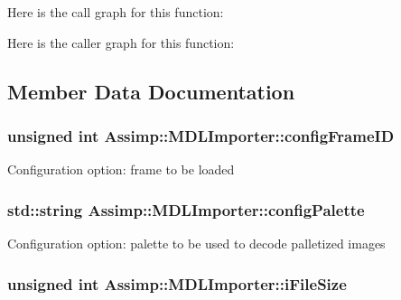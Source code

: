 Here is the call graph for this function\+:




Here is the caller graph for this function\+:




\subsection{Member Data Documentation}
\hypertarget{class_assimp_1_1_m_d_l_importer_a4c132778226da8c47fa3bc964c2cca73}{
\subsubsection[{config\+Frame\+I\+D}]{\setlength{\rightskip}{0pt plus 5cm}unsigned int Assimp\+::\+M\+D\+L\+Importer\+::config\+Frame\+I\+D\hspace{0.3cm}{\ttfamily [protected]}}}\label{class_assimp_1_1_m_d_l_importer_a4c132778226da8c47fa3bc964c2cca73}
Configuration option\+: frame to be loaded \hypertarget{class_assimp_1_1_m_d_l_importer_ab551f430fb4e07102424d27ae788fbf7}{
\subsubsection[{config\+Palette}]{\setlength{\rightskip}{0pt plus 5cm}std\+::string Assimp\+::\+M\+D\+L\+Importer\+::config\+Palette\hspace{0.3cm}{\ttfamily [protected]}}}\label{class_assimp_1_1_m_d_l_importer_ab551f430fb4e07102424d27ae788fbf7}
Configuration option\+: palette to be used to decode palletized images \hypertarget{class_assimp_1_1_m_d_l_importer_a1690abad19b3d5cab5e9880b2fdcfa94}{
\subsubsection[{i\+File\+Size}]{\setlength{\rightskip}{0pt plus 5cm}unsigned int Assimp\+::\+M\+D\+L\+Importer\+::i\+File\+Size\hspace{0.3cm}{\ttfamily [protected]}}}\label{class_assimp_1_1_m_d_l_importer_a1690abad19b3d5cab5e9880b2fdcfa94}
